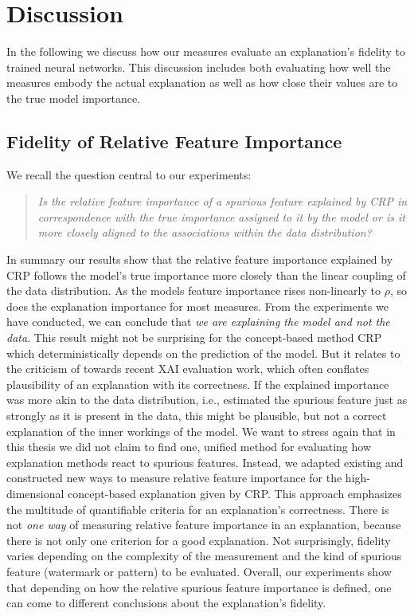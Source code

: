 \chapter{Discussion}\label{chapter:discussion}
In the following we discuss how our measures evaluate an explanation's fidelity to trained neural networks. This discussion includes both evaluating how well the measures embody the actual explanation as well as how close their values are to the true model importance. 

\section{Fidelity of Relative Feature Importance}
We recall the question central to our experiments:
\begin{quote}
    \textit{Is the relative feature importance of a spurious feature explained by CRP in correspondence with the true importance assigned to it by the model or is it more closely aligned to the associations within the data distribution?}
\end{quote}

In summary our results show that the relative feature importance explained by CRP follows the model's true importance more closely than the linear coupling of the data distribution. As the models feature importance rises non-linearly to $\rho$, so does the explanation importance for most measures. From the experiments we have conducted, we can conclude that \textit{we are explaining the model and not the data}. This result might not be surprising for the concept-based method CRP which deterministically depends on the prediction of the model. But it relates to the criticism of \cite{Nauta2023} towards recent XAI evaluation work, which often conflates plausibility of an explanation with its correctness. If the explained importance was more akin to the data distribution, i.e., estimated the spurious feature just as strongly as it is present in the data, this might be plausible, but not a correct explanation of the inner workings of the model. 
We want to stress again that in this thesis we did not claim to find one, unified method for evaluating how explanation methods react to spurious features. Instead, we adapted existing and constructed new ways to measure relative feature importance for the high-dimensional concept-based explanation given by CRP. This approach emphasizes the multitude of quantifiable criteria for an explanation's correctness. There is not \textit{one way} of measuring relative feature importance in an explanation, because there is not only one criterion for a good explanation. 
Not surprisingly, fidelity varies depending on the complexity of the measurement and the kind of spurious feature (watermark or pattern) to be evaluated. Overall, our experiments show that depending on how the relative spurious feature importance is defined, one can come to different conclusions about the explanation's fidelity. 

